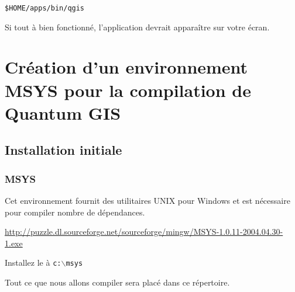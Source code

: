 \begin{verbatim}
$HOME/apps/bin/qgis 
\end{verbatim}

Si tout \`a bien fonctionn\'e, l'application devrait appara\^itre sur votre \'ecran.

% 
% 
% 
% 

\section{Cr\'eation d'un environnement MSYS pour la compilation de Quantum GIS}
\subsection{Installation initiale}
\subsubsection{MSYS}
Cet environnement fournit des utilitaires UNIX pour Windows et est n\'ecessaire pour compiler nombre de d\'ependances.

\url{
http://puzzle.dl.sourceforge.net/sourceforge/mingw/MSYS-1.0.11-2004.04.30-1.exe}

Installez le \`a \texttt{c:$\backslash$msys}

Tout ce que nous allons compiler sera plac\'e dans ce r\'epertoire.

% 
% 
% 


